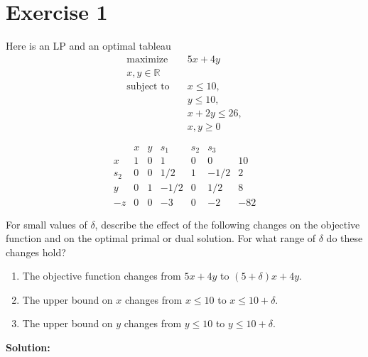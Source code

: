 \documentclass{article}
\begin{document}
\section*{Exercise 1}
Here is an LP and an optimal tableau
\begin{align*}
\text{maximize} \quad & 5x + 4y \\
x, y \in \mathbb{R} & \\
\text{subject to} \quad & x \leq 10, \\
& y \leq 10, \\
& x + 2y \leq 26, \\
& x, y \geq 0
\end{align*}

$$\begin{array}{c|ccccc|c}
& x & y & s_1 & s_2 & s_3 & \\
\hline
x & 1 & 0 & 1 & 0 & 0 & 10 \\
s_2 & 0 & 0 & 1/2 & 1 & -1/2 & 2 \\
y & 0 & 1 & -1/2 & 0 & 1/2 & 8 \\
\hline
-z & 0 & 0 & -3 & 0 & -2 & -82
\end{array}$$

For small values of $\delta$, describe the effect of the following changes on the objective function and on the optimal primal or dual solution. For what range of $\delta$ do these changes hold?

\begin{enumerate}[label=(\alph*)]
    \item The objective function changes from $5x + 4y$ to $(5 + \delta)x + 4y$.

    \item The upper bound on $x$ changes from $x \leq 10$ to $x \leq 10 + \delta$.

    \item The upper bound on $y$ changes from $y \leq 10$ to $y \leq 10 + \delta$.
\end{enumerate}

\textbf{Solution: } \\
\end{document}
